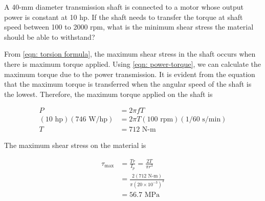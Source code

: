 \documentclass[
10pt,
a4paper,
openany,
svgnames,
]{book} %
\begin{document}
\begin{example}
  A 40-mm diameter transmission shaft is connected to a motor whose output power is constant at 10 hp.  If the shaft needs to transfer the torque at shaft speed between 100 to 2000 rpm, what is the minimum shear stress the material should be able to withstand?
  
    \begin{figure}[H]
    \centering
  \end{figure}
  
\end{example}
\begin{solution}
From \cref{eqn: torsion formula}, the maximum shear stress in the shaft occurs when there is maximum torque applied. Using \cref{eqn: power-torque}, we can calculate the maximum torque due to the power transmission. It is evident from the equation that the maximum torque is transferred when the angular speed of the shaft is the lowest. Therefore, the maximum torque applied on the shaft is

\begin{align*}
  P &= 2\pi fT \\ 
  (10 \text{ hp})(746 \text{ W/hp}) &= 2\pi T (100 \text{ rpm})(1/60 \text{ s/min}) \\ 
  T &= 712 \text{ N-m}
\end{align*}	

The maximum shear stress on the material is

\begin{align*}
  {\tau _{\max }} &= \frac{{Tr}}{{{I_p}}} = \frac{{2T}}{{\pi {r^3}}} \\[5pt]
                  &= \frac{2(712 \text{ N-m})}{\pi (20 \times 10^{ - 3})^3} \\[5pt]
                  &= 56.7 \text{ MPa}  
\end{align*}

\end{solution}
\end{document}
